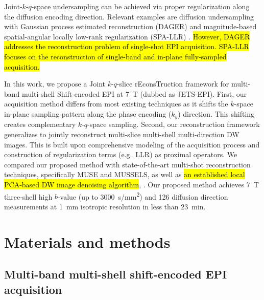 \documentclass[preprint,12pt,authoryear,review]{elsarticle}
\begin{document}
    Joint-$k$-$q$-space undersampling can be achieved via proper regularization
    along the diffusion encoding direction.
    Relevant examples are
    diffusion undersampling with Gaussian process estimated reconstruction (DAGER)
    \citep{wu_2019_dager} and magnitude-based spatial-angular locally low-rank regularization
    (SPA-LLR) \citep{hu_2020_spa_llr}.
    \hl{However, DAGER addresses the reconstruction problem
    of single-shot EPI acquisition.
    SPA-LLR focuses on the reconstruction
    of single-band and in-plane fully-sampled acquisition.}

    In this work, we propose a Joint $k$-$q$-slice rEconsTruction framework
    for multi-band multi-shell Shift-encoded EPI at \SI{7}{\tesla}
    (dubbed as JETS-EPI).
    First, our acquisition method differs from most existing techniques
    as it shifts the $k$-space in-plane sampling pattern
    along the phase encoding ($k_y$) direction.
    This shifting creates complementary $k$-$q$-space sampling.
    Second, our reconstruction framework generalizes to
    jointly reconstruct multi-slice multi-shell multi-direction DW images.
    This is built upon comprehensive modeling of the acquisition process
    and construction of regularization terms (e.g.~LLR) as proximal operators.
    We compared our proposed method with
    state-of-the-art multi-shot reconstruction techniques,
    specifically MUSE and MUSSELS,
    as well as
    \hl{an established local PCA-based DW image denoising algorithm},
    \citep{manjon_2013_localpca,veraart_2016_denoise}.
    Our proposed method achieves \SI{7}{\tesla}
    three-shell high $b$-value (up to \SI{3000}{s/mm^2})
    and 126 diffusion direction measurements
    at \SI{1}{mm} isotropic resolution in less than \SI{23}{min}.

    \clearpage

    \section{Materials and methods}
    \label{SEC:Meth}

    \subsection{Multi-band multi-shell shift-encoded EPI acquisition}
\end{document}

